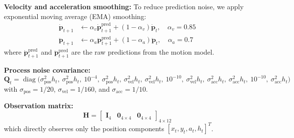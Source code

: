 \textbf{Velocity and acceleration smoothing:}
To reduce prediction noise, we apply exponential moving average (EMA) smoothing:
\begin{align}
\dot{\mathbf{p}}_{t+1} &\leftarrow \alpha_v \dot{\mathbf{p}}_{t+1}^{\text{pred}} + (1-\alpha_v) \dot{\mathbf{p}}_t, \quad \alpha_v = 0.85 \\
\ddot{\mathbf{p}}_{t+1} &\leftarrow \alpha_a \ddot{\mathbf{p}}_{t+1}^{\text{pred}} + (1-\alpha_a) \ddot{\mathbf{p}}_t, \quad \alpha_a = 0.7
\end{align}
where $\dot{\mathbf{p}}_{t+1}^{\text{pred}}$ and $\ddot{\mathbf{p}}_{t+1}^{\text{pred}}$ are the raw predictions from the motion model.

\textbf{Process noise covariance:}
\begin{equation}
\mathbf{Q}_t = \operatorname{diag}\big(
   \sigma_{\text{pos}}^2 h_t,\ 
   \sigma_{\text{pos}}^2 h_t,\ 
   10^{-4},\ 
   \sigma_{\text{pos}}^2 h_t,\ 
   \sigma_{\text{vel}}^2 h_t,\ 
   \sigma_{\text{vel}}^2 h_t,\ 
   10^{-10},\ 
   \sigma_{\text{vel}}^2 h_t,\ 
   \sigma_{\text{acc}}^2 h_t,\ 
   \sigma_{\text{acc}}^2 h_t,\ 
   10^{-10},\ 
   \sigma_{\text{acc}}^2 h_t
\big)
\end{equation}
with $\sigma_{\text{pos}} = 1/20$, $\sigma_{\text{vel}} = 1/160$, and $\sigma_{\text{acc}} = 1/10$.

\textbf{Observation matrix:}
\begin{equation}
\mathbf{H} = \begin{bmatrix}
\mathbf{I}_4 & \mathbf{0}_{4 \times 4} & \mathbf{0}_{4 \times 4}
\end{bmatrix}_{4 \times 12}
\end{equation}
which directly observes only the position components $[x_t, y_t, a_t, h_t]^T$.

